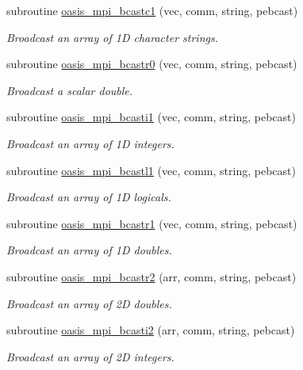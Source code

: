\begin{DoxyCompactItemize}
subroutine \hyperlink{classmod__oasis__mpi_a99b3a1ab4c7617b5bc83d3c6360aaef3}{oasis\+\_\+mpi\+\_\+bcastc1} (vec, comm, string, pebcast)
\begin{DoxyCompactList}\small\item\em Broadcast an array of 1\+D character strings. \end{DoxyCompactList}\item 
subroutine \hyperlink{classmod__oasis__mpi_a3b21bebef1b56b31bd6d07e83d7a59a6}{oasis\+\_\+mpi\+\_\+bcastr0} (vec, comm, string, pebcast)
\begin{DoxyCompactList}\small\item\em Broadcast a scalar double. \end{DoxyCompactList}\item 
subroutine \hyperlink{classmod__oasis__mpi_a6f9140637f29d3939dc9c53930101e2e}{oasis\+\_\+mpi\+\_\+bcasti1} (vec, comm, string, pebcast)
\begin{DoxyCompactList}\small\item\em Broadcast an array of 1\+D integers. \end{DoxyCompactList}\item 
subroutine \hyperlink{classmod__oasis__mpi_a8b03787549fba5faff499c946d521db0}{oasis\+\_\+mpi\+\_\+bcastl1} (vec, comm, string, pebcast)
\begin{DoxyCompactList}\small\item\em Broadcast an array of 1\+D logicals. \end{DoxyCompactList}\item 
subroutine \hyperlink{classmod__oasis__mpi_a6f12178b027ff30cb87f9f8313b459d5}{oasis\+\_\+mpi\+\_\+bcastr1} (vec, comm, string, pebcast)
\begin{DoxyCompactList}\small\item\em Broadcast an array of 1\+D doubles. \end{DoxyCompactList}\item 
subroutine \hyperlink{classmod__oasis__mpi_ab14018fe59cd737067e4f4202a3eeb39}{oasis\+\_\+mpi\+\_\+bcastr2} (arr, comm, string, pebcast)
\begin{DoxyCompactList}\small\item\em Broadcast an array of 2\+D doubles. \end{DoxyCompactList}\item 
subroutine \hyperlink{classmod__oasis__mpi_ad6918adccdd62a278066f41b0b8edf57}{oasis\+\_\+mpi\+\_\+bcasti2} (arr, comm, string, pebcast)
\begin{DoxyCompactList}\small\item\em Broadcast an array of 2\+D integers. \end{DoxyCompactList}\item 

\end{DoxyCompactItemize}
